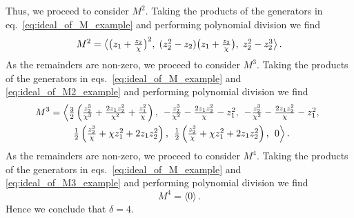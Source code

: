 \documentclass[dvipsnames,preprint,12pt,sort&compress]{elsarticle}
\begin{document}
Thus, we proceed to consider $M^2$. Taking the products of the generators
in eq.~\eqref{eq:ideal_of_M_example} and performing polynomial division
we find
\begin{equation}
M^2 = \big\langle \big( z_1 +\textstyle{\frac{z_2}{\chi}} \big)^2, \hspace{1mm}
(z_2^2-z_2) \big(z_1 +\textstyle{\frac{z_2}{\chi}} \big), \hspace{1mm}
z_2^2-z_2^3 \big\rangle \,.
\label{eq:ideal_of_M2_example}
\end{equation}
As the remainders are non-zero, we proceed to consider $M^3$. Taking the
products of the generators in eqs.~\eqref{eq:ideal_of_M_example} and \eqref{eq:ideal_of_M2_example}
and performing polynomial division we find
\begin{align}
M^3 &= \Big\langle \textstyle{\frac{3}{2}} \left( \textstyle{\frac{z_2^3}{\chi^3}}+\textstyle{\frac{2 z_1 z_2^2}{\chi^2}}+\textstyle{\frac{z_1^2}{\chi}}\right), \hspace{1.5mm}
-\textstyle{\frac{z_2^3}{\chi^2}}-\textstyle{\frac{2 z_1 z_2^2}{\chi}}-z_1^2, \hspace{1.5mm}
-\textstyle{\frac{z_2^3}{\chi^2}}-\textstyle{\frac{2 z_1 z_2^2}{\chi}}-z_1^2, \hspace{1.5mm} \nonumber \\
& \hspace{8.5mm} \textstyle{\frac{1}{2}} \left(\textstyle{\frac{z_2^3}{\chi}}+\chi z_1^2+2 z_1 z_2^2\right), \hspace{1.5mm}
\textstyle{\frac{1}{2}} \left(\textstyle{\frac{z_2^3}{\chi}}+\chi z_1^2+2 z_1 z_2^2\right), \hspace{1.5mm}
0 \Big\rangle \,.
\label{eq:ideal_of_M3_example}
\end{align}
As the remainders are non-zero, we proceed to consider $M^4$. Taking the
products of the generators in eqs.~\eqref{eq:ideal_of_M_example} and \eqref{eq:ideal_of_M3_example}
and performing polynomial division we find
\begin{equation}
M^4 = \langle 0 \rangle \,.
\label{eq:ideal_of_M4_example}
\end{equation}
Hence we conclude that $\delta = 4$.
\end{document}

